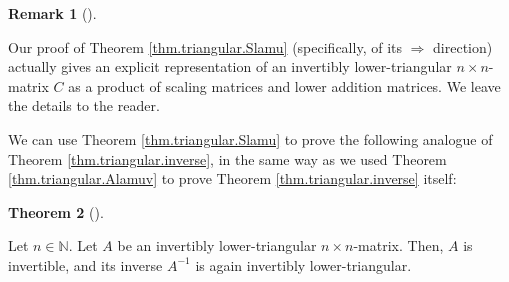\documentclass[numbers=enddot,12pt,final,onecolumn,notitlepage]{scrartcl}%
\theoremstyle{definition}
\newtheorem{theo}{Theorem}[section]
\newenvironment{theorem}[1][]
{\begin{theo}[#1]\begin{leftbar}}
{\end{leftbar}\end{theo}}
\newtheorem{remk}[theo]{Remark}
\newenvironment{remark}[1][]
{\begin{remk}[#1]\begin{leftbar}}
{\end{leftbar}\end{remk}}
\begin{document}
\begin{remark}
Our proof of Theorem \ref{thm.triangular.Slamu} (specifically, of its
$\Longrightarrow$ direction) actually gives an explicit representation of an
invertibly lower-triangular $n\times n$-matrix $C$ as a product of scaling
matrices and lower addition matrices. We leave the details to the reader.
\end{remark}

We can use Theorem \ref{thm.triangular.Slamu} to prove the following analogue
of Theorem \ref{thm.triangular.inverse}, in the same way as we used Theorem
\ref{thm.triangular.Alamuv} to prove Theorem \ref{thm.triangular.inverse} itself:

\begin{theorem}
\label{thm.triangular.inverse.inv}Let $n\in\mathbb{N}$. Let $A$ be an
invertibly lower-triangular $n\times n$-matrix. Then, $A$ is invertible, and
its inverse $A^{-1}$ is again invertibly lower-triangular.
\end{theorem}
\end{document}
